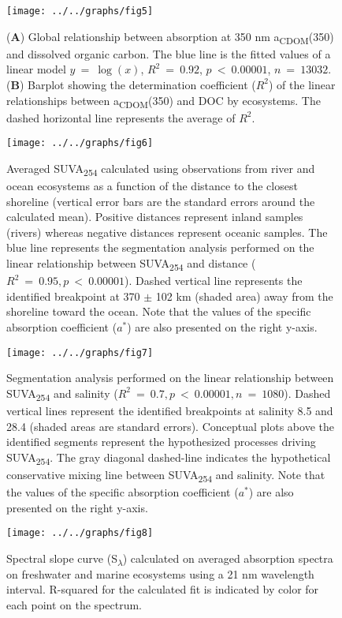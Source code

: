 \documentclass[12pt,a4paper]{scrartcl}
\begin{document}
\clearpage
\newpage

\begin{figure}[h]
	\centering
	\texttt{[image: ../../graphs/fig5]}
	\caption{(\textbf{A}) Global relationship between absorption at 350 nm a\textsubscript{CDOM}(350) and dissolved organic carbon. The blue line is the fitted values of a linear model $y~=~\log(x)$, $R^2~=~0.92$, $p~<~0.00001$, $n~=~13032$. (\textbf{B}) Barplot showing the determination coefficient ($R^2$) of the linear relationships between a\textsubscript{CDOM}(350) and DOC by ecosystems. The dashed horizontal line represents the average of $R^2$.}
\end{figure}

\clearpage
\newpage

\begin{figure}[h]
	\centering
	\texttt{[image: ../../graphs/fig6]}
	\caption{Averaged SUVA\textsubscript{254} calculated using observations from river and ocean ecosystems as a function of the distance to the closest shoreline (vertical error bars are the standard errors around the calculated mean). Positive distances represent inland samples (rivers) whereas negative distances represent oceanic samples. The blue line represents the segmentation analysis performed on the linear relationship between SUVA\textsubscript{254} and distance ($R^2~=~0.95, p~<~0.00001$). Dashed vertical line represents the identified breakpoint at 370 $\pm$ 102 km (shaded area) away from the shoreline toward the ocean.  Note that the values of the specific absorption coefficient ($a^*$) are also presented on the right y-axis.}

\end{figure}

\clearpage
\newpage

\begin{figure}[h]
	\centering
	\texttt{[image: ../../graphs/fig7]}
	\caption{Segmentation analysis performed on the linear relationship between SUVA\textsubscript{254} and salinity ($R^2~=~0.7, p~<~0.00001, n~=~1080$). Dashed vertical lines represent the identified breakpoints at salinity 8.5 and 28.4 (shaded areas are standard errors). Conceptual plots above the identified segments represent the hypothesized processes driving SUVA\textsubscript{254}. The gray diagonal dashed-line indicates the hypothetical conservative mixing line between SUVA\textsubscript{254} and salinity.  Note that the values of the specific absorption coefficient ($a^*$) are also presented on the right y-axis.}
\end{figure}

\clearpage
\newpage

\begin{figure}[h]
	\centering
	\texttt{[image: ../../graphs/fig8]}
	\caption{Spectral slope curve (S\textsubscript{$\lambda$}) calculated on averaged absorption spectra on freshwater and marine ecosystems using a 21 nm wavelength interval. R-squared for the calculated fit is indicated by color for each point on the spectrum.}
\end{figure}
\end{document}
